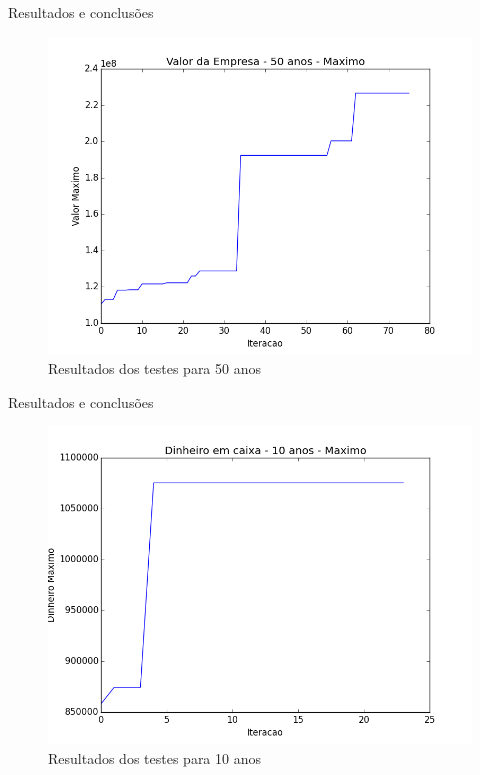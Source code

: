 \documentclass[10pt]{beamer}
\begin{document}
\begin{frame}{Resultados e conclusões}
	\begin{figure}
		\centering
		\includegraphics[width=1\linewidth]{value-50yrs-best}
		\caption{Resultados dos testes para 50 anos}
		\label{fig:value-50yrs-best}
	\end{figure}
	
\end{frame}

\begin{frame}{Resultados e conclusões}
	\begin{figure}
		\centering
		\includegraphics[width=1\linewidth]{money-10yrs-best}
		\caption{Resultados dos testes para 10 anos}
		\label{fig:money-10yrs-best}
	\end{figure}
	
\end{frame}
\end{document}
